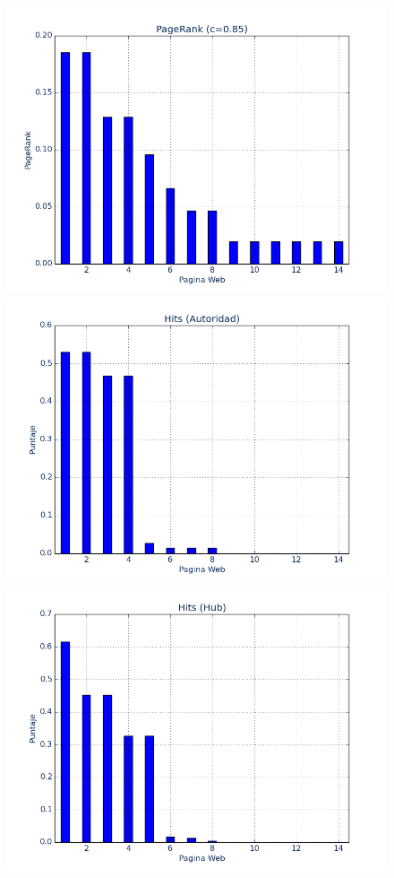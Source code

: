 \documentclass[a4paper]{article}
\begin{document}
\begin{figure}[ht]
\centering
\includegraphics[scale=0.33]{img/casorealPage.png}
\includegraphics[scale=0.33]{img/casoRealAut.png} \\
\includegraphics[scale=0.33]{img/casoRealHub.png}

\end{figure}
\end{document}
